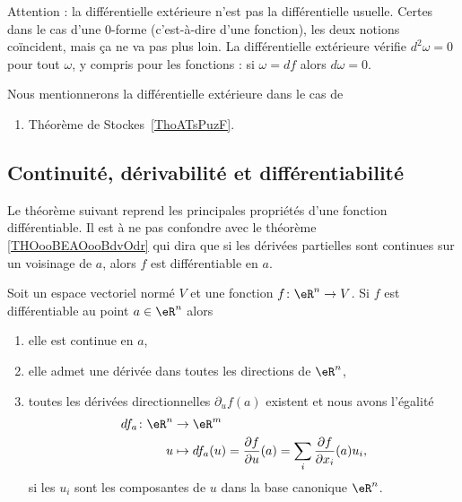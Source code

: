 Attention : la différentielle extérieure n'est pas la différentielle usuelle. Certes dans le cas d'une \( 0\)-forme (c'est-à-dire d'une fonction), les deux notions coïncident, mais ça ne va pas plus loin. La différentielle extérieure vérifie \( d^2\omega=0\) pour tout \( \omega\), y compris pour les fonctions : si \( \omega=df\) alors \( d\omega=0\).

Nous mentionnerons la différentielle extérieure dans le cas de
\begin{enumerate}
	\item
	      Théorème de Stockes~\ref{ThoATsPuzF}.
\end{enumerate}

\subsection{Continuité, dérivabilité et différentiabilité}

Le théorème suivant reprend les principales propriétés d'une fonction différentiable. Il est à ne pas confondre avec le théorème \ref{THOooBEAOooBdvOdr} qui dira que si les dérivées partielles sont continues sur un voisinage de \( a\), alors \( f\) est différentiable en \( a\).
\begin{proposition}\label{diff1}\label{ThoRapPropDiffSi}
	Soit un espace vectoriel normé \( V\) et une fonction \( f\colon \eR^n\to V\). Si \( f\) est différentiable au point \( a\in \eR^n\) alors
	\begin{enumerate}
		\item
		      elle est continue en \( a\),
		\item
		      elle admet une dérivée dans toutes les directions de \( \eR^n\),
		\item  toutes les dérivées directionnelles \( \partial_uf(a)\) existent et nous avons l'égalité
		      \begin{equation}        \label{EqDiffPartRap}
			      \begin{aligned}
				      df_a\colon \eR^n & \to \eR^m                                                                                              \\
				      u                & \mapsto df_a(u)=\frac{ \partial f }{ \partial u }(a)=\sum_i \frac{ \partial f }{ \partial x_i }(a)u_i,
			      \end{aligned}
		      \end{equation}
		      si les \( u_i\) sont les composantes de \( u\) dans la base canonique \( \eR^n\).
	\end{enumerate}
\end{proposition}

